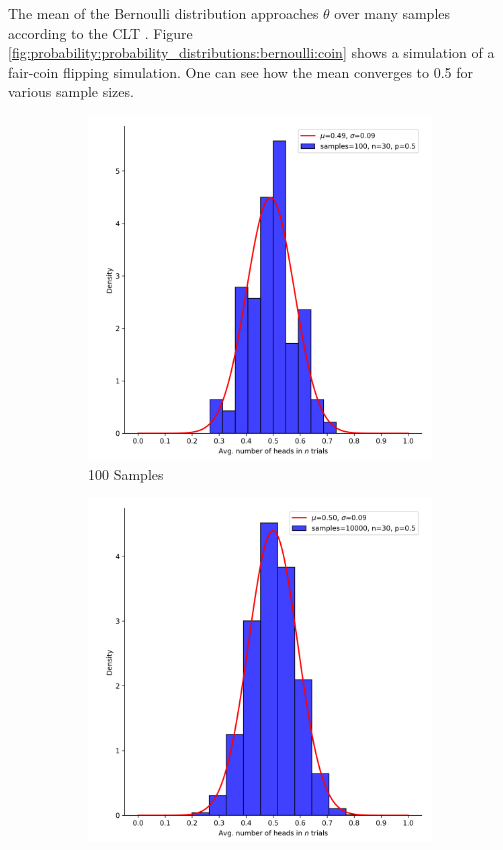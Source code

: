 The mean of the Bernoulli distribution approaches $\theta$ over many samples according to the \ac{CLT} \cite{ref:grinstead:1997}. Figure \ref{fig:probability:probability_distributions:bernoulli:coin} shows a simulation of a fair-coin flipping simulation. One can see how the mean converges to 0.5 for various sample sizes.

\begin{figure}[htbp]
    \begin{subfigure}{0.49\textwidth}
        \includegraphics[width=\textwidth]{images/coin_flip_samples_100.png}
        \caption{100 Samples}
        \label{fig:probability:probability_distributions:bernoulli:coin_100}
    \end{subfigure}
    \begin{subfigure}{0.49\textwidth}
        \includegraphics[width=\textwidth]{images/coin_flip_samples_10000.png}

\end{subfigure}
\end{figure}
